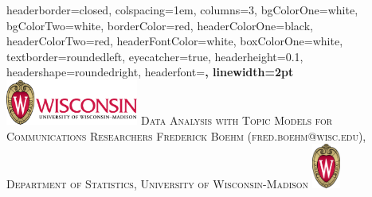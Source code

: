 \documentclass[landscape,a0paper,fontscale=0.25]{baposter} %
\begin{document}
\begin{poster}
{
headerborder=closed, %
colspacing=1em, %
columns=3,
bgColorOne=white, %
bgColorTwo=white, %
borderColor=red, %
headerColorOne=black, %
headerColorTwo=red, %
headerFontColor=white, %
boxColorOne=white, %
textborder=roundedleft, %
eyecatcher=true, %
headerheight=0.1\textheight, %
headershape=roundedright, %
headerfont=\Large\bf\textsc, %
linewidth=2pt %
}
%
{\includegraphics[height=4em]{UWlogo_fl_4c.png}} %
{\textsc{Data Analysis with Topic Models for Communications Researchers}}%
{\normalsize\textsc{Frederick Boehm (fred.boehm@wisc.edu), Department of Statistics, 
University of Wisconsin-Madison}} %
{\includegraphics[height=4em]{UWCrest_4c.png}} %



\end{poster}
\end{document}

